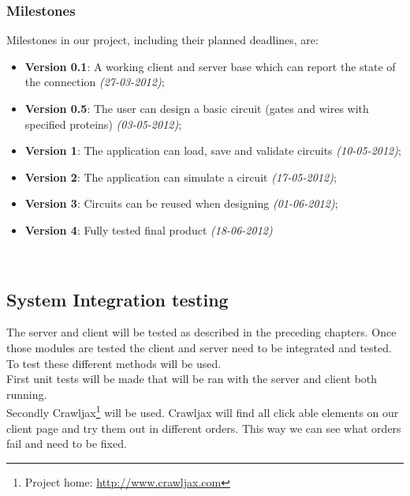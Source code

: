 \documentclass[a4paper]{article}
\begin{document}
\subsubsection{Milestones}
Milestones in our project, including their planned deadlines, are:
\begin{itemize}
\item \textbf{Version 0.1}: A working client and server base which can report the state of the connection \emph{(27-03-2012)};
\item \textbf{Version 0.5}: The user can design a basic circuit (gates and wires with specified proteins) \emph{(03-05-2012)};
\item \textbf{Version 1}: The application can load, save and validate circuits \emph{(10-05-2012)};
\item \textbf{Version 2}: The application can simulate a circuit \emph{(17-05-2012)};
\item \textbf{Version 3}: Circuits can be reused when designing \emph{(01-06-2012)};
\item \textbf{Version 4}: Fully tested final product \emph{(18-06-2012)}
\end{itemize}~\\




\subsection{System Integration testing}
The server and client will be tested as described in the preceding chapters. Once those modules are tested the client and server need to be integrated and tested. To test these different methods will be used.\\
First unit tests will be made that will be ran with the server and client both running.\\
Secondly Crawljax\footnote{ Project home: \url{http://www.crawljax.com}} will be used. Crawljax will find all click able elements on our client page and try them out in different orders. This way we can see what orders fail and need to be fixed.\\

\end{document}
